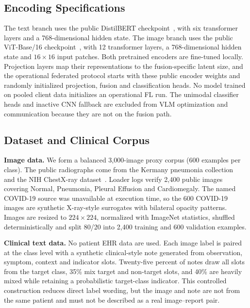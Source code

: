 \documentclass[letterpaper, conference]{IEEEtran}
\begin{document}
\subsection{Encoding Specifications}
The text branch uses the public DistilBERT checkpoint~\cite{Sanh2019}, with six
transformer layers and a 768-dimensional hidden state. The image branch uses the
public ViT-Base/16 checkpoint~\cite{Dosovitskiy2021}, with 12 transformer layers,
a 768-dimensional hidden state and $16{\times}16$ input patches. Both pretrained
encoders are fine-tuned locally. Projection layers map their representations to
the fusion-specific latent size, and the operational federated protocol starts
with these public encoder weights and randomly initialized projection, fusion and
classification heads. No model trained on pooled client data initializes an
operational FL run. The unimodal classifier heads and inactive CNN fallback are
excluded from VLM optimization and communication because they are not on the
fusion path.

\subsection{Dataset and Clinical Corpus}

\textbf{Image data.}
We form a balanced 3,000-image proxy corpus (600 examples per class). The public
radiographs come from the Kermany pneumonia collection~\cite{Kermany2018} and the
NIH ChestX-ray dataset~\cite{Wang2017chestxray8}. Loader logs verify 2,400 public
images covering Normal, Pneumonia, Pleural Effusion and Cardiomegaly. The named
COVID-19 source was unavailable at execution time, so the 600 COVID-19 images are
synthetic X-ray-style surrogates with bilateral opacity patterns. Images are
resized to $224{\times}224$, normalized with ImageNet statistics, shuffled
deterministically and split 80/20 into 2,400 training and 600 validation examples.

\textbf{Clinical text data.}
No patient EHR data are used. Each image label is paired at the class level with a
synthetic clinical-style note generated from observation, symptom, context and
indicator slots. Twenty-five percent of notes draw all slots from the target
class, 35\% mix target and non-target slots, and 40\% are heavily mixed while
retaining a probabilistic target-class indicator. This controlled construction
reduces direct label wording, but the image and note are not from the same patient
and must not be described as a real image--report pair.
\end{document}

